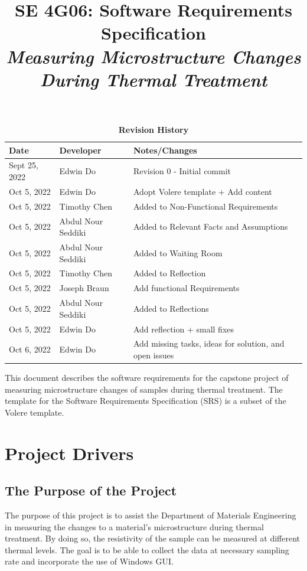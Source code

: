 \documentclass[12pt, titlepage]{article}
\title{SE 4G06: Software Requirements Specification\\\textit{Measuring Microstructure Changes During Thermal Treatment }}
\author{\authname}
\date{}
\begin{document}
\maketitle

\tableofcontents
\listoftables
\listoffigures

\begin{table}[H]
\caption{\bf Revision History}
\begin{tabularx}{\textwidth}{p{2.5cm}p{2.5cm}X}
\toprule {\bf Date} & {\bf Developer} & {\bf Notes/Changes}\\
\midrule
Sept 25, 2022 & Edwin Do & Revision 0 - Initial commit\\
Oct 5, 2022 & Edwin Do & Adopt Volere template + Add content \\
Oct 5, 2022 & Timothy Chen & Added to Non-Functional Requirements\\
Oct 5, 2022 & Abdul Nour Seddiki & Added to Relevant Facts and Assumptions\\
Oct 5, 2022 & Abdul Nour Seddiki & Added to Waiting Room\\
Oct 5, 2022 & Timothy Chen & Added to Reflection\\
Oct 5, 2022 & Joseph Braun & Add functional Requirements \\ 
Oct 5, 2022 & Abdul Nour Seddiki & Added to Reflections\\
Oct 5, 2022 & Edwin Do & Add reflection + small fixes \\
Oct 6, 2022 & Edwin Do & Add missing tasks, ideas for solution, and open issues \\
\bottomrule
\end{tabularx}
\end{table}

\newpage


\noindent This document describes the software requirements for the capstone project of measuring microstructure changes of samples during thermal treatment. The template for the Software Requirements Specification (SRS) is a subset of the Volere
template.


\section{Project Drivers}

\subsection{The Purpose of the Project}
The purpose of this project is to assist the Department of Materials Engineering in measuring the changes to a material's microstructure during thermal treatment. 
By doing so, the resistivity of the sample can be measured at different thermal levels. The goal is to be able to collect the data at necessary sampling rate and 
incorporate the use of Windows GUI. 
\end{document}
